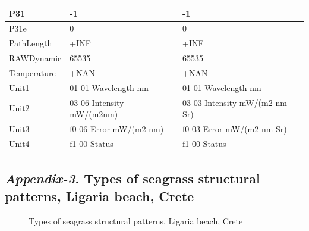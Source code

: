 \documentclass[11pt]{article}
\begin{document}
\begin{appendices}
\begin{table}[H]
\begin{tabular}{| p{3cm} | p{3cm} | p{5cm} |}
	    P31 & -1 & -1 \\ \hline
	   P31e & 0 & 0 \\ \hline
	   PathLength & +INF & +INF \\ \hline
	   RAWDynamic & 65535 & 65535 \\ \hline
	   Temperature & +NAN & +NAN \\ \hline
	   Unit1 & 01-01 Wavelength nm &  01-01 Wavelength nm \\ \hline
	   Unit2 & 03-06 Intensity mW/(m2nm) & 03 03 Intensity mW/(m2 nm Sr) \\ \hline
	   Unit3 & f0-06 Error mW/(m2 nm) & f0-03 Error mW/(m2 nm Sr) \\ \hline
	  Unit4 & f1-00 Status & f1-00 Status \\ \hline
	\end{tabular}
\end{table}
\pagebreak

\subsection[\textit{Appendix-3}. Types of seagrass structural patterns]{\textit{Appendix-3}. Types of seagrass structural patterns, Ligaria beach, Crete}

\begin{figure}[h]
	\centering
	\hspace{1mm}
	\hspace{1mm}
	\caption{Types of seagrass structural patterns, Ligaria beach, Crete}
	\label{fig:A.3}
\end{figure}


\end{appendices}
\end{document}
